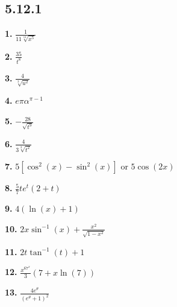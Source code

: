 \documentclass[12pt,]{book}
\theoremstyle{plain}
\theoremstyle{definition}
\numberwithin{equation}{section}
\newcommand{\fe}[2]{#1\mathopen{}\left(#2\right)\mathclose{}}
\begin{document}
            \par\smallskip
\subsection*{5.12.1 }
\noindent\textbf{1.}\quad{}
                    \(\frac{1}{11\sqrt[11]{x^{5}}}\)%

                \par\smallskip
\noindent\textbf{2.}\quad{}
                    \(\frac{35}{t^8}\)%

                \par\smallskip
\noindent\textbf{3.}\quad{}
                    \(\frac{4}{\sqrt[3]{u^2}}\)%

                \par\smallskip
\noindent\textbf{4.}\quad{}
                    \(e\pi\alpha^{\pi-1}\)%

                \par\smallskip
\noindent\textbf{5.}\quad{}
                    \(-\frac{28}{\sqrt{t^{9}}}\)%

                \par\smallskip
\noindent\textbf{6.}\quad{}
                    \(\frac{4}{3\sqrt[3]{t^{2}}}\)%

                \par\smallskip
\noindent\textbf{7.}\quad{}
                    \(5\left[\fe{\cos^2}{x}-\fe{\sin^2}{x}\right]\) or \(5\fe{\cos}{2x}\)%

                \par\smallskip
\noindent\textbf{8.}\quad{}
                    \(\frac{5}{7}te^t(2+t)\)%

                \par\smallskip
\noindent\textbf{9.}\quad{}
                    \(4(\fe{\ln}{x}+1)\)%

                \par\smallskip
\noindent\textbf{10.}\quad{}
                    \(2x\fe{\sin^{-1}}{x}+\frac{x^2}{\sqrt{1-x^2}}\)%

                \par\smallskip
\noindent\textbf{11.}\quad{}
                    \(2t\fe{\tan^{-1}}{t}+1\)%

                \par\smallskip
\noindent\textbf{12.}\quad{}
                    \(\frac{x^67^x}{3}(7+x\fe{\ln}{7})\)%

                \par\smallskip
\noindent\textbf{13.}\quad{}
                    \(\frac{4e^{\theta}}{\left(e^\theta+1\right)^2}\)%
\end{document}
